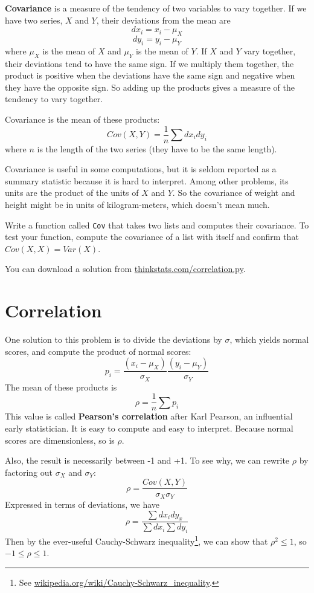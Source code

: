\documentclass[12pt]{book}
\begin{document}
{\bf Covariance} is a measure of the tendency of two variables
to vary together.  If we have two series, $X$ and $Y$, their
deviations from the mean are
%
\[ dx_i = x_i - \mu_X \]
%
\[ dy_i = y_i - \mu_Y \]
%
where $\mu_X$ is the mean of $X$ and $\mu_Y$ is the mean of $Y$.
If $X$ and $Y$ vary together, their deviations tend to have the same
sign.
If we multiply them together, the product is positive when the
deviations have the same sign and negative when they have the opposite
sign.  So adding up the products gives a measure of the tendency to
vary together.

Covariance is the mean of these products:
%
\[ Cov(X,Y) = \frac{1}{n} \sum dx_i dy_i \]
%
where $n$ is the length of the two series (they have to be the same
length).

Covariance is useful in some computations, but
it is seldom reported as a summary statistic because it is hard to
interpret.  Among other problems, its units are the product of the
units of $X$ and $Y$.  So the covariance of weight and height might be
in units of kilogram-meters, which doesn't mean much.

\begin{ex}

Write a function called {\tt Cov} that takes two lists
and computes their covariance.  To test your function, compute
the covariance of a list with itself and confirm that
$Cov(X, X) = Var(X)$.

You can download a solution from
\url{thinkstats.com/correlation.py}.

\end{ex}


\section{Correlation}

One solution to this problem is to divide the deviations by $\sigma$,
which yields normal scores, and compute the product of normal scores:
%
\[ p_i = \frac{(x_i - \mu_X)}{\sigma_X} \frac{(y_i - \mu_Y)}{\sigma_Y} \]
%
The mean of these products is
%
\[ \rho = \frac{1}{n} \sum p_i \]
%
This value is called {\bf Pearson's correlation} after Karl Pearson,
an influential early statistician.  It is easy to compute and easy to
interpret.  Because normal scores are dimensionless, so is $\rho$.

Also, the result is necessarily between -1 and +1.  To see why, we
can rewrite $\rho$ by factoring out $\sigma_X$ and $\sigma_Y$:
%
\[ \rho = \frac{Cov(X,Y)}{\sigma_X \sigma_Y} \]
%
Expressed in terms of deviations, we have
%
\[ \rho = \frac{\sum dx_i dy_x}{\sum dx_i \sum dy_i} \]
%
Then by the ever-useful Cauchy-Schwarz inequality\footnote{See
  \url{wikipedia.org/wiki/Cauchy-Schwarz_inequality}.}, we can show
that $\rho^2 \le 1$, so $-1 \le \rho \le 1$.
\end{document}
